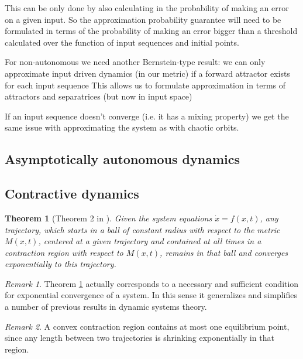 \documentclass{article}
\newtheorem{theorem}{Theorem}
\theoremstyle{definition}
\theoremstyle{remark}
\newtheorem{remark}{Remark}
\newcounter{ct}
\begin{document}
This can be only done by also calculating in the probability of making an error on a given input.
So the approximation probability guarantee will need to be formulated in terms of the probability of making an error bigger than a threshold calculated over the function of input sequences and initial points.

For non-autonomous we need another Bernstein-type result:
we can only approximate input driven dynamics (in our metric) if a forward attractor exists for each input sequence 
This allows us to formulate approximation in terms of attractors and separatrices (but now in input space)

If an input sequence doesn't converge (i.e. it has a mixing property) we get the same issue with approximating the system as with chaotic orbits.



\subsection{Asymptotically autonomous dynamics}


\subsection{Contractive dynamics}

\begin{theorem}[Theorem 2 in \citep{lohmiller1998contraction}]\label{thrm:contractive}
Given the system equations $\dot x = f(x,t)$, any trajectory, which starts in a ball of constant radius with respect to the metric $M(x,t)$, centered at a given trajectory and contained at all times in a contraction region with respect to $M(x,t)$,  remains in that ball and converges exponentially to this trajectory.
\end{theorem}

\begin{remark}
Theorem \ref{thrm:contractive} actually corresponds to a necessary and sufficient condition for exponential convergence of a system. In this sense it generalizes and simplifies a number of previous results in dynamic systems theory.
\end{remark}

\begin{remark}
A convex contraction region contains at most one equilibrium point, since any length between two trajectories is shrinking exponentially in that region.
\end{remark}
\end{document}
